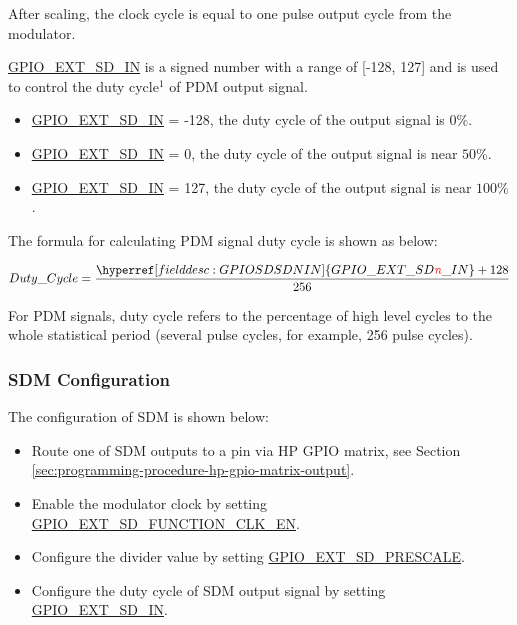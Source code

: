 \documentclass[main\_\_EN.tex]{subfiles}
\begin{document}
After scaling, the clock cycle is equal to one pulse output cycle from the modulator.

\hyperref[fielddesc:GPIOSDSDNIN]{GPIO\_EXT\_SD\_IN} is a signed number with a range of [-128, 127] and is used to control the duty cycle$^{1}$ of PDM output signal.

\begin{itemize}
    \item \hyperref[fielddesc:GPIOSDSDNIN]{GPIO\_EXT\_SD\_IN} = -128, the duty cycle of the output signal is \begin{math}0\% \end{math}.
    \item \hyperref[fielddesc:GPIOSDSDNIN]{GPIO\_EXT\_SD\_IN} = 0, the duty cycle of the output signal is near \begin{math}50\% \end{math}.
    \item \hyperref[fielddesc:GPIOSDSDNIN]{GPIO\_EXT\_SD\_IN} = 127, the duty cycle of the output signal is near \begin{math}100\% \end{math}.
\end{itemize}

The formula for calculating PDM signal duty cycle is shown as below:

    \[
    Duty\_Cycle=\frac{\hyperref[fielddesc:GPIOSDSDNIN]{GPIO\_EXT\_SD\regindex{n}\_IN} + 128} {256}
    \]

\begin{tiplisting}
For PDM signals, duty cycle refers to the percentage of high level cycles to the whole statistical period (several pulse cycles, for example, 256 pulse cycles).
\end{tiplisting}

\subsubsection{SDM Configuration}

The configuration of SDM is shown below:

\begin{itemize}
    \item Route one of SDM outputs to a pin via HP GPIO matrix, see Section  \ref{sec:programming-procedure-hp-gpio-matrix-output}.
    \item Enable the modulator clock by setting  \hyperref[fielddesc:GPIOSDFUNCTIONCLKEN]{GPIO\_EXT\_SD\_FUNCTION\_CLK\_EN}.
    \item Configure the divider value by setting  \hyperref[fielddesc:GPIOSDSDNPRESCALE]{GPIO\_EXT\_SD\_PRESCALE}.
    \item Configure the duty cycle of SDM output signal by setting  \hyperref[fielddesc:GPIOSDSDNIN]{GPIO\_EXT\_SD\_IN}.
\end{itemize}
\end{document}
